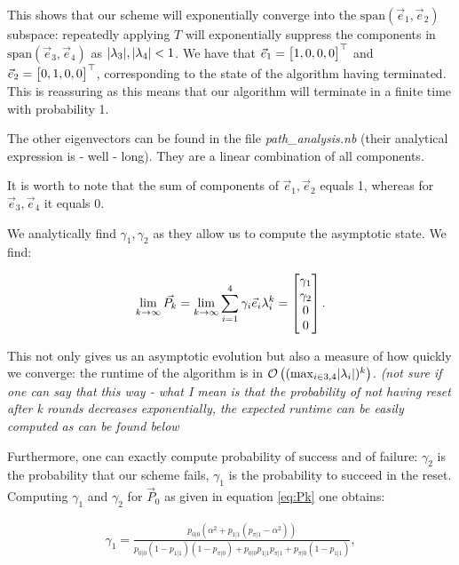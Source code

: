 This shows that our scheme will exponentially converge into the $\mathrm{span}(\vec e_1, \vec e_2)$ subspace: repeatedly applying $T$ will exponentially suppress the components in $\mathrm{span}(\vec e_3, \vec e_4)$ as $\lvert \lambda_3 \rvert, \lvert \lambda_4 \rvert < 1$. We have that $\vec e_1 = \begin{bmatrix}1, 0, 0, 0\end{bmatrix}^\top$ and $\vec e_2 = \begin{bmatrix}0, 1, 0, 0\end{bmatrix}^\top$, corresponding to the state of the algorithm having terminated. This is reassuring as this means that our algorithm will terminate in a finite time with probability 1. 

The other eigenvectors can be found in the file \textit{path\_analysis.nb} (their analytical expression is - well - long). They are a linear combination of all components. %

It is worth to note that the sum of components of $\vec e_1, \vec e_2$ equals 1, whereas for $\vec e_3, \vec e_4$ it equals 0. %


We analytically find $\gamma_1, \gamma_2$ as they allow us to compute the asymptotic state. We find: 

\begin{equation}
    \lim_{k \to \infty}\Vec{P_k} = \lim_{k \to \infty} \sum_{i=1}^4 \gamma_i \vec e_i \lambda_i ^k = \begin{bmatrix}\gamma_1 \\ \gamma_2\\0 \\ 0\end{bmatrix}.
\end{equation}

This not only gives us an asymptotic evolution but also a measure of how quickly we converge: the runtime of the algorithm is in $\mathcal{O} \left((\max_{i \in {3,4}}\lvert \lambda_i \rvert)^k\right)$. \textit{(not sure if one can say that this way - what I mean is that the probability of not having reset after k rounds decreases exponentially, the expected runtime can be easily computed as can be found below}

Furthermore, one can exactly compute probability of success and of failure: $\gamma_2$ is the probability that our scheme fails, $\gamma_1$ is the probability to succeed in the reset. Computing $\gamma_1$ and $\gamma_2$ for $\vec P_0$ as given in equation \ref{eq:Pk} one obtains: 

\begin{equation}
    \begin{split}
        \gamma_1 = \frac{p_{0|0} \left(\alpha ^2+p_{1|1} \left(p_{\pi|1}-\alpha ^2\right)\right)}{p_{0|0} (1-p_{1|1}) (1-p_{\pi|0})+p_{0|0} p_{1|1} p_{\pi|1}+ p_{\pi|0}(1-p_{1|1})},
    \end{split}
\end{equation}

